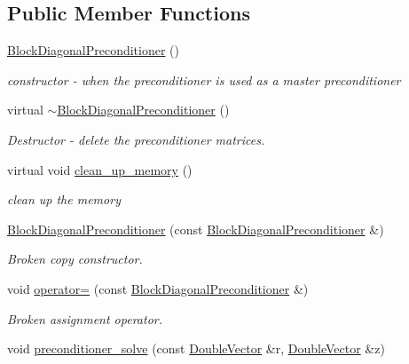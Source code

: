 \subsection*{Public Member Functions}
\begin{DoxyCompactItemize}
\item 
\hyperlink{classoomph_1_1BlockDiagonalPreconditioner_ac96219565cebd7fcf593173b7027e1bb}{Block\+Diagonal\+Preconditioner} ()
\begin{DoxyCompactList}\small\item\em constructor -\/ when the preconditioner is used as a master preconditioner \end{DoxyCompactList}\item 
virtual \hyperlink{classoomph_1_1BlockDiagonalPreconditioner_a132fe93f9a469cf81740ac4723084526}{$\sim$\+Block\+Diagonal\+Preconditioner} ()
\begin{DoxyCompactList}\small\item\em Destructor -\/ delete the preconditioner matrices. \end{DoxyCompactList}\item 
virtual void \hyperlink{classoomph_1_1BlockDiagonalPreconditioner_aced1bed34b9f6a11903d5fd3ae42ece8}{clean\+\_\+up\+\_\+memory} ()
\begin{DoxyCompactList}\small\item\em clean up the memory \end{DoxyCompactList}\item 
\hyperlink{classoomph_1_1BlockDiagonalPreconditioner_a3effb680084c6ff09d10723569d49f8f}{Block\+Diagonal\+Preconditioner} (const \hyperlink{classoomph_1_1BlockDiagonalPreconditioner}{Block\+Diagonal\+Preconditioner} \&)
\begin{DoxyCompactList}\small\item\em Broken copy constructor. \end{DoxyCompactList}\item 
void \hyperlink{classoomph_1_1BlockDiagonalPreconditioner_a103d94fce9576d964d5213f72c074a60}{operator=} (const \hyperlink{classoomph_1_1BlockDiagonalPreconditioner}{Block\+Diagonal\+Preconditioner} \&)
\begin{DoxyCompactList}\small\item\em Broken assignment operator. \end{DoxyCompactList}\item 
void \hyperlink{classoomph_1_1BlockDiagonalPreconditioner_a129f0d7877ced9efaa3a7f018618f44b}{preconditioner\+\_\+solve} (const \hyperlink{classoomph_1_1DoubleVector}{Double\+Vector} \&r, \hyperlink{classoomph_1_1DoubleVector}{Double\+Vector} \&z)

\end{DoxyCompactItemize}
